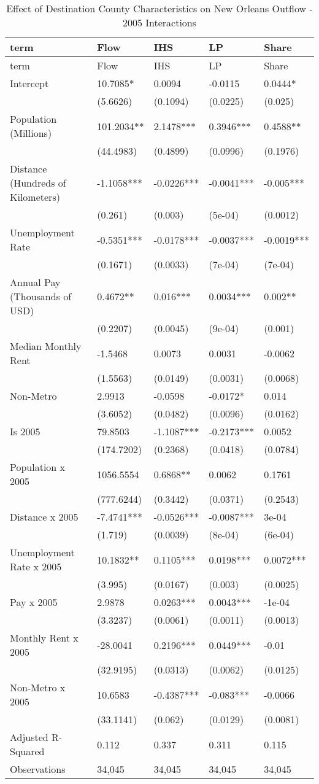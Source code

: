 \documentclass[]{article}
\begin{document}
\clearpage

\begin{longtable}[]{@{}lllll@{}}
\caption{\label{tab:reg2005}Effect of Destination County Characteristics
on New Orleans Outflow - 2005 Interactions}\tabularnewline
\toprule
term & Flow & IHS & LP & Share\tabularnewline
\midrule
\endfirsthead
\toprule
term & Flow & IHS & LP & Share\tabularnewline
\midrule
\endhead
Intercept & 10.7085* & 0.0094 & -0.0115 & 0.0444*\tabularnewline
& (5.6626) & (0.1094) & (0.0225) & (0.025)\tabularnewline
Population (Millions) & 101.2034** & 2.1478*** & 0.3946*** &
0.4588**\tabularnewline
& (44.4983) & (0.4899) & (0.0996) & (0.1976)\tabularnewline
Distance (Hundreds of Kilometers) & -1.1058*** & -0.0226*** & -0.0041***
& -0.005***\tabularnewline
& (0.261) & (0.003) & (5e-04) & (0.0012)\tabularnewline
Unemployment Rate & -0.5351*** & -0.0178*** & -0.0037*** &
-0.0019***\tabularnewline
& (0.1671) & (0.0033) & (7e-04) & (7e-04)\tabularnewline
Annual Pay (Thousands of USD) & 0.4672** & 0.016*** & 0.0034*** &
0.002**\tabularnewline
& (0.2207) & (0.0045) & (9e-04) & (0.001)\tabularnewline
Median Monthly Rent & -1.5468 & 0.0073 & 0.0031 & -0.0062\tabularnewline
& (1.5563) & (0.0149) & (0.0031) & (0.0068)\tabularnewline
Non-Metro & 2.9913 & -0.0598 & -0.0172* & 0.014\tabularnewline
& (3.6052) & (0.0482) & (0.0096) & (0.0162)\tabularnewline
Is 2005 & 79.8503 & -1.1087*** & -0.2173*** & 0.0052\tabularnewline
& (174.7202) & (0.2368) & (0.0418) & (0.0784)\tabularnewline
Population x 2005 & 1056.5554 & 0.6868** & 0.0062 &
0.1761\tabularnewline
& (777.6244) & (0.3442) & (0.0371) & (0.2543)\tabularnewline
Distance x 2005 & -7.4741*** & -0.0526*** & -0.0087*** &
3e-04\tabularnewline
& (1.719) & (0.0039) & (8e-04) & (6e-04)\tabularnewline
Unemployment Rate x 2005 & 10.1832** & 0.1105*** & 0.0198*** &
0.0072***\tabularnewline
& (3.995) & (0.0167) & (0.003) & (0.0025)\tabularnewline
Pay x 2005 & 2.9878 & 0.0263*** & 0.0043*** & -1e-04\tabularnewline
& (3.3237) & (0.0061) & (0.0011) & (0.0013)\tabularnewline
Monthly Rent x 2005 & -28.0041 & 0.2196*** & 0.0449*** &
-0.01\tabularnewline
& (32.9195) & (0.0313) & (0.0062) & (0.0125)\tabularnewline
Non-Metro x 2005 & 10.6583 & -0.4387*** & -0.083*** &
-0.0066\tabularnewline
& (33.1141) & (0.062) & (0.0129) & (0.0081)\tabularnewline
Adjusted R-Squared & 0.112 & 0.337 & 0.311 & 0.115\tabularnewline
Observations & 34,045 & 34,045 & 34,045 & 34,045\tabularnewline
\bottomrule
\end{longtable}
\end{document}

